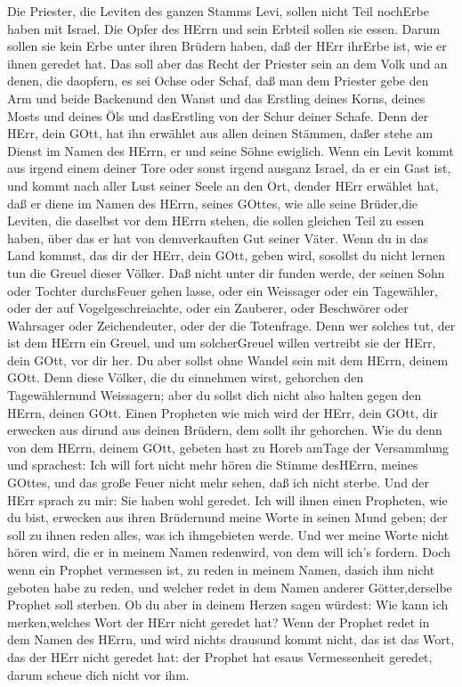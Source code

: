  Die Priester, die Leviten des ganzen Stamms Levi, sollen
nicht Teil nochErbe haben mit Israel. Die Opfer des HErrn und sein
Erbteil sollen sie essen.  Darum sollen sie kein Erbe unter
ihren Brüdern haben, daß der HErr ihrErbe ist, wie er ihnen geredet hat.
 Das soll aber das Recht der Priester sein an dem Volk und
an denen, die daopfern, es sei Ochse oder Schaf, daß man dem Priester
gebe den Arm und beide Backenund den Wanst  und das Erstling
deines Korns, deines Mosts und deines Öls und dasErstling von der Schur
deiner Schafe.  Denn der HErr, dein GOtt, hat ihn erwählet
aus allen deinen Stämmen, daßer stehe am Dienst im Namen des HErrn, er
und seine Söhne ewiglich.  Wenn ein Levit kommt aus irgend
einem deiner Tore oder sonst irgend ausganz Israel, da er ein Gast ist,
und kommt nach aller Lust seiner Seele an den Ort, dender HErr erwählet
hat,  daß er diene im Namen des HErrn, seines GOttes, wie
alle seine Brüder,die Leviten, die daselbst vor dem HErrn stehen,
 die sollen gleichen Teil zu essen haben, über das er hat
von demverkauften Gut seiner Väter.  Wenn du in das Land
kommst, das dir der HErr, dein GOtt, geben wird, sosollst du nicht
lernen tun die Greuel dieser Völker.  Daß nicht unter dir
funden werde, der seinen Sohn oder Tochter durchsFeuer gehen lasse, oder
ein Weissager oder ein Tagewähler, oder der auf Vogelgeschreiachte, oder
ein Zauberer,  oder Beschwörer oder Wahrsager oder
Zeichendeuter, oder der die Totenfrage.  Denn wer solches
tut, der ist dem HErrn ein Greuel, und um solcherGreuel willen vertreibt
sie der HErr, dein GOtt, vor dir her.  Du aber sollst ohne
Wandel sein mit dem HErrn, deinem GOtt.  Denn diese Völker,
die du einnehmen wirst, gehorchen den Tagewählernund Weissagern; aber du
sollst dich nicht also halten gegen den HErrn, deinen GOtt.
 Einen Propheten wie mich wird der HErr, dein GOtt, dir
erwecken aus dirund aus deinen Brüdern, dem sollt ihr gehorchen.
 Wie du denn von dem HErrn, deinem GOtt, gebeten hast zu
Horeb amTage der Versammlung und sprachest: Ich will fort nicht mehr
hören die Stimme desHErrn, meines GOttes, und das große Feuer nicht mehr
sehen, daß ich nicht sterbe.  Und der HErr sprach zu mir:
Sie haben wohl geredet.  Ich will ihnen einen Propheten,
wie du bist, erwecken aus ihren Brüdernund meine Worte in seinen Mund
geben; der soll zu ihnen reden alles, was ich ihmgebieten werde.
 Und wer meine Worte nicht hören wird, die er in meinem
Namen redenwird, von dem will ich's fordern.  Doch wenn ein
Prophet vermessen ist, zu reden in meinem Namen, dasich ihm nicht
geboten habe zu reden, und welcher redet in dem Namen anderer
Götter,derselbe Prophet soll sterben.  Ob du aber in deinem
Herzen sagen würdest: Wie kann ich merken,welches Wort der HErr nicht
geredet hat?  Wenn der Prophet redet in dem Namen des
HErrn, und wird nichts drausund kommt nicht, das ist das Wort, das der
HErr nicht geredet hat: der Prophet hat esaus Vermessenheit geredet,
darum scheue dich nicht vor ihm.

